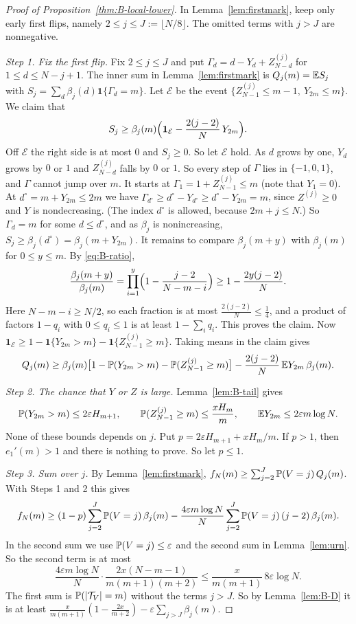 \begin{proof}[Proof of Proposition~\ref{thm:B-local-lower}]
In Lemma~\ref{lem:firstmark}, keep only early first flips, namely $2\le j\le J:=\lfloor N/8\rfloor$. The omitted terms with $j>J$ are nonnegative.

\emph{Step 1. Fix the first flip.} Fix $2\le j\le J$ and put
$\Gamma_d=d-Y_d+Z^{(j)}_{N-d}$ for $1\le d\le N-j+1$. The inner sum in
Lemma~\ref{lem:firstmark} is $Q_j(m)=\mathbb{E} S_j$ with
$S_j=\sum_d\beta_j(d)\mathbf 1\{\Gamma_d=m\}$. Let $\mathcal E$ be the event
$\{Z^{(j)}_{N-1}\le m-1,\ Y_{2m}\le m\}$. We claim that
\[
 S_j\ge\beta_j(m)\Bigl(\mathbf 1_{\mathcal E}-\frac{2(j-2)}N\,Y_{2m}\Bigr).
\]
Off $\mathcal E$ the right side is at most $0$ and $S_j\ge0$. So let
$\mathcal E$ hold. As $d$ grows by one, $Y_d$ grows by $0$ or $1$ and
$Z^{(j)}_{N-d}$ falls by $0$ or $1$. So every step of $\Gamma$ lies in
$\{-1,0,1\}$, and $\Gamma$ cannot jump over $m$. It starts at
$\Gamma_1=1+Z^{(j)}_{N-1}\le m$ (note that $Y_1=0$). At
$d^\circ=m+Y_{2m}\le2m$ we have
$\Gamma_{d^\circ}\ge d^\circ-Y_{d^\circ}\ge d^\circ-Y_{2m}=m$, since
$Z^{(j)}\ge0$ and $Y$ is nondecreasing. (The index $d^\circ$ is allowed,
because $2m+j\le N$.) So $\Gamma_d=m$ for some $d\le d^\circ$, and as
$\beta_j$ is nonincreasing, $S_j\ge\beta_j(d^\circ)=\beta_j(m+Y_{2m})$. It
remains to compare $\beta_j(m+y)$ with $\beta_j(m)$ for $0\le y\le m$. By
\eqref{eq:B-ratio},
\[
 \frac{\beta_j(m+y)}{\beta_j(m)}=\prod_{i=1}^y\Bigl(1-\frac{j-2}{N-m-i}\Bigr)
 \ge1-\frac{2y(j-2)}N .
\]
Here $N-m-i\ge N/2$, so each fraction is at most
$\frac{2(j-2)}N\le\frac14$, and a product of factors $1-q_i$ with
$0\le q_i\le1$ is at least $1-\sum_iq_i$. This proves the claim. Now
$\mathbf 1_{\mathcal E}\ge1-\mathbf 1\{Y_{2m}>m\}-\mathbf 1\{Z^{(j)}_{N-1}\ge m\}$.
Taking means in the claim gives
\[
 Q_j(m)\ge\beta_j(m)\bigl[1-\mathbb{P}(Y_{2m}>m)-\mathbb{P}(Z^{(j)}_{N-1}\ge m)\bigr]
 -\frac{2(j-2)}N\,\mathbb{E} Y_{2m}\,\beta_j(m).
\]

\emph{Step 2. The chance that $Y$ or $Z$ is large.} Lemma~\ref{lem:B-tail}
gives
\[
 \mathbb{P}(Y_{2m}>m)\le2\varepsilon H_{m+1},\qquad
 \mathbb{P}(Z^{(j)}_{N-1}\ge m)\le\frac{xH_m}m,\qquad
 \mathbb{E} Y_{2m}\le2\varepsilon m\log N .
\]
None of these bounds depends on $j$. Put $p=2\varepsilon H_{m+1}+xH_m/m$.
If $p>1$, then $e_1'(m)>1$ and there is nothing to prove. So let
$p\le1$.

\emph{Step 3. Sum over $j$.} By Lemma~\ref{lem:firstmark},
$f_N(m)\ge\sum_{j=2}^J\mathbb{P}(V=j)\,Q_j(m)$. With Steps 1 and 2 this gives
\[
 f_N(m)\ge(1-p)\sum_{j=2}^J\mathbb{P}(V=j)\,\beta_j(m)
 -\frac{4\varepsilon m\log N}N\sum_{j=2}^J\mathbb{P}(V=j)\,(j-2)\,\beta_j(m).
\]
In the second sum we use $\mathbb{P}(V=j)\le\varepsilon$ and the second sum in
Lemma~\ref{lem:urn}. So the second term is at most
\[
 \frac{4\varepsilon m\log N}N\cdot\frac{2x(N-m-1)}{m(m+1)(m+2)}
 \le\frac{x}{m(m+1)}\,8\varepsilon\log N .
\]
The first sum is $\mathbb{P}(\lvert\mathcal T_V\rvert=m)$ without the terms $j>J$. So by
Lemma~\ref{lem:B-D} it is at least
$\frac{x}{m(m+1)}(1-\frac{2x}{m+2})-\varepsilon\sum_{j>J}\beta_j(m)$.


\end{proof}
